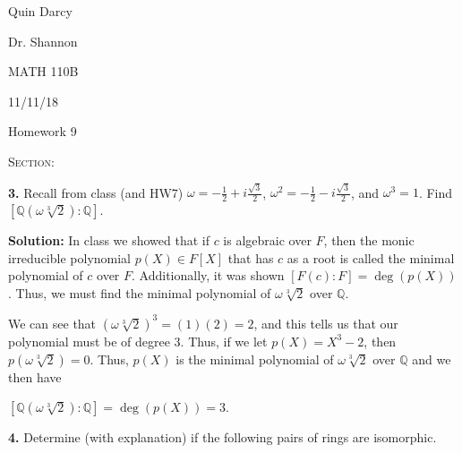 \documentclass[12pt, a4paper]{article}
\begin{document}
  
\begin{flushleft}
  
    Quin Darcy\par
    Dr. Shannon\par
    MATH 110B\par
    11/11/18
  
\end{flushleft}
  
\centerline{Homework 9}
 
\vspace{4mm}
 
\noindent\textsc{Section: }\par
 
\justifying
 
\vspace{1mm}
 
\hline
 
\vspace{4mm}

\noindent\textbf{3.} Recall from class (and HW7) $\omega=-\frac{1}{2}+i\frac{\sqrt{3}}{2}$, $\omega^2=-\frac{1}{2}-i\frac{\sqrt{3}}{2}$, and $\omega^3=1$. Find $[\mathbb{Q}(\omega\sqrt[3]{2})\colon\mathbb{Q}]$.

\vspace{4mm}

\noindent\textbf{Solution:} In class we showed that if $c$ is algebraic over $F$, then the monic irreducible polynomial $p(X)\in F[X]$ that has $c$ as a root is called the minimal polynomial of $c$ over $F$. Additionally, it was shown $[F(c)\colon F]=\deg(p(X))$. Thus, we must find the minimal polynomial of $\omega\sqrt[3]{2}$ over $\mathbb{Q}$.\par
We can see that $(\omega\sqrt[3]{2})^3=(1)(2)=2$, and this tells us that our polynomial must be of degree 3. Thus, if we let $p(X)=X^3-2$, then $p(\omega\sqrt[3]{2})=0$. Thus, $p(X)$ is the minimal polynomial of $\omega\sqrt[3]{2}$ over $\mathbb{Q}$ and we then have

\vspace{2mm}

\centerline{$[\mathbb{Q}(\omega\sqrt[3]{2})\colon\mathbb{Q}]=\deg(p(X))=3$.}

\vspace{4mm}

\noindent\textbf{4.} Determine (with explanation) if the following pairs of rings are isomorphic.

\vspace{4mm}\par
\end{document}
